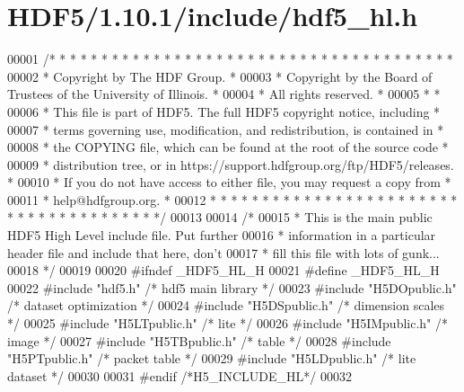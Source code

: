 \hypertarget{_h_d_f5_21_810_81_2include_2hdf5__hl_8h_source}{}\section{H\+D\+F5/1.10.1/include/hdf5\+\_\+hl.h}
\label{_h_d_f5_21_810_81_2include_2hdf5__hl_8h_source}

\begin{DoxyCode}
00001 \textcolor{comment}{/* * * * * * * * * * * * * * * * * * * * * * * * * * * * * * * * * * * * * * *}
00002 \textcolor{comment}{ * Copyright by The HDF Group.                                               *}
00003 \textcolor{comment}{ * Copyright by the Board of Trustees of the University of Illinois.         *}
00004 \textcolor{comment}{ * All rights reserved.                                                      *}
00005 \textcolor{comment}{ *                                                                           *}
00006 \textcolor{comment}{ * This file is part of HDF5.  The full HDF5 copyright notice, including     *}
00007 \textcolor{comment}{ * terms governing use, modification, and redistribution, is contained in    *}
00008 \textcolor{comment}{ * the COPYING file, which can be found at the root of the source code       *}
00009 \textcolor{comment}{ * distribution tree, or in https://support.hdfgroup.org/ftp/HDF5/releases.  *}
00010 \textcolor{comment}{ * If you do not have access to either file, you may request a copy from     *}
00011 \textcolor{comment}{ * help@hdfgroup.org.                                                        *}
00012 \textcolor{comment}{ * * * * * * * * * * * * * * * * * * * * * * * * * * * * * * * * * * * * * * */}
00013 
00014 \textcolor{comment}{/*}
00015 \textcolor{comment}{ * This is the main public HDF5 High Level include file.  Put further}
00016 \textcolor{comment}{ * information in a particular header file and include that here, don't}
00017 \textcolor{comment}{ * fill this file with lots of gunk...}
00018 \textcolor{comment}{ */}
00019 
00020 \textcolor{preprocessor}{#ifndef \_HDF5\_HL\_H}
00021 \textcolor{preprocessor}{#define \_HDF5\_HL\_H}
00022 \textcolor{preprocessor}{#include "hdf5.h"}       \textcolor{comment}{/* hdf5 main library */}
00023 \textcolor{preprocessor}{#include "H5DOpublic.h"} \textcolor{comment}{/* dataset optimization */}
00024 \textcolor{preprocessor}{#include "H5DSpublic.h"} \textcolor{comment}{/* dimension scales */}
00025 \textcolor{preprocessor}{#include "H5LTpublic.h"} \textcolor{comment}{/* lite */}
00026 \textcolor{preprocessor}{#include "H5IMpublic.h"} \textcolor{comment}{/* image */}
00027 \textcolor{preprocessor}{#include "H5TBpublic.h"} \textcolor{comment}{/* table */}
00028 \textcolor{preprocessor}{#include "H5PTpublic.h"} \textcolor{comment}{/* packet table */}
00029 \textcolor{preprocessor}{#include "H5LDpublic.h"} \textcolor{comment}{/* lite dataset */}
00030 
00031 \textcolor{preprocessor}{#endif }\textcolor{comment}{/*H5\_INCLUDE\_HL*/}\textcolor{preprocessor}{}
00032 
\end{DoxyCode}
